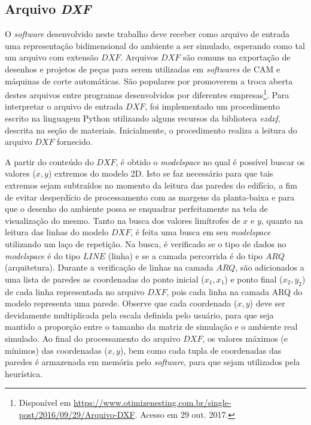 \documentclass[
	12pt,				%
	twoside,			%
	a4paper,			%
	english,			%
	french,				%
	spanish,			%
	brazil				%
	]{abntex2}
\begin{document}
\subsection{\texorpdfstring{Arquivo
\emph{DXF}}{Arquivo DXF}}\label{arquivo-dxf}

O \emph{software} desenvolvido neste trabalho deve receber como arquivo
de entrada uma representação bidimensional do ambiente a ser simulado,
esperando como tal um arquivo com extensão \(DXF\). Arquivos \(DXF\) são
comuns na exportação de desenhos e projetos de peças para serem
utilizadas em \emph{softwares} de CAM e máquinas de corte automáticas.
São populares por promoverem a troca aberta destes arquivos entre
programas desenvolvidos por diferentes empresas\footnote{Disponível em
  \url{https://www.otimizenesting.com.br/single-post/2016/09/29/Arquivo-DXF}.
  Acesso em 29 out. 2017.}. Para interpretar o arquivo de entrada
\(DXF\), foi implementado um procedimento escrito na linguagem Python
utilizando alguns recursos da biblioteca \emph{ezdxf}, descrita na seção
de materiais. Inicialmente, o procedimento realiza a leitura do arquivo
\(DXF\) fornecido.

A partir do conteúdo do \(DXF\), é obtido o \emph{modelspace} no qual é
possível buscar os valores (\(x, y\)) extremos do modelo 2D. Isto se faz
necessário para que tais extremos sejam subtraídos no momento da leitura
das paredes do edifício, a fim de evitar desperdício de processamento
com as margens da planta-baixa e para que o desenho do ambiente possa se
enquadrar perfeitamente na tela de visualização do mesmo. Tanto na busca
dos valores limítrofes de \(x\) e \(y\), quanto na leitura das linhas do
modelo \(DXF\), é feita uma busca em seu \emph{modelspace} utilizando um
laço de repetição. Na busca, é verificado se o tipo de dados no
\emph{modelspace} é do tipo \(LINE\) (linha) e se a camada percorrida é
do tipo \(ARQ\) (arquitetura). Durante a verificação de linhas na camada
\(ARQ\), são adicionados a uma lista de paredes as coordenadas do ponto
inicial (\(x_{1},x_{1}\)) e ponto final (\(x_{2},y_{2}\)) de cada linha
representada no arquivo \(DXF\), pois cada linha na camada ARQ do modelo
representa uma parede. Observe que cada coordenada (\(x, y\)) deve ser
devidamente multiplicada pela escala definida pelo usuário, para que
seja mantido a proporção entre o tamanho da matriz de simulação e o
ambiente real simulado. Ao final do processamento do arquivo \(DXF\), os
valores máximos (e mínimos) das coordenadas (\(x, y\)), bem como cada
tupla de coordenadas das paredes é armazenada em memória pelo
\emph{software}, para que sejam utilizados pela heurística.
\end{document}
